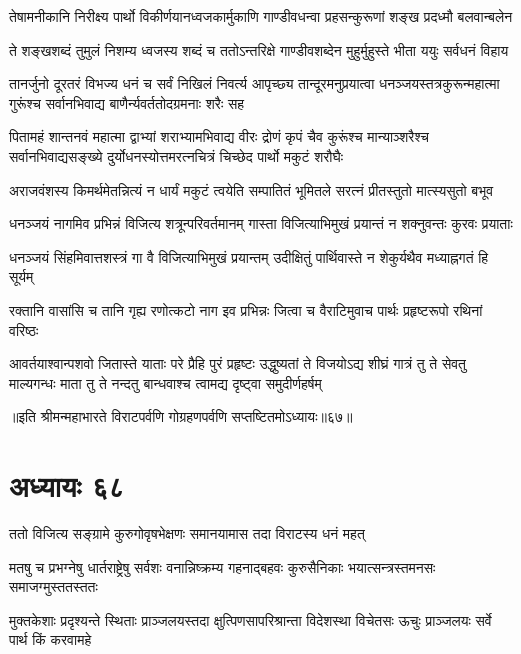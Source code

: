 \twolineshloka
{तेषामनीकानि निरीक्ष्य पार्थो विकीर्णयानध्वजकार्मुकाणि}
{गाण्डीवधन्वा प्रहसन्कुरूणां शङ्ख प्रदध्मौ बलवान्बलेन}


\twolineshloka
{ते शङ्खशब्दं तुमुलं निशम्य ध्वजस्य शब्दं च ततोऽन्तरिक्षे}
{गाण्डीवशब्देन मुहुर्मुहुस्ते भीता ययुः सर्वधनं विहाय}


\threelineshloka
{तानर्जुनो दूरतरं विभज्य धनं च सर्वं निखिलं निवर्त्य}
{आपृच्छ्य तान्दूरमनुप्रयात्वा धनञ्जयस्तत्रकुरून्महात्मा}
{गुरूंश्च सर्वानभिवाद्य बाणैर्न्यवर्ततोदग्रमनाः शरैः सह}


\threelineshloka
{पितामहं शान्तनवं महात्मा द्वाभ्यां शराभ्यामभिवाद्य वीरः}
{द्रोणं कृपं चैव कुरूंश्च मान्याञ्शरैश्च सर्वानभिवाद्यसङ्ख्ये}
{दुर्योधनस्योत्तमरत्नचित्रं चिच्छेद पार्थो मकुटं शरौघैः}


\twolineshloka
{अराजवंशस्य किमर्थमेतन्नित्यं न धार्यं मकुटं त्वयेति}
{सम्पातितं भूमितले सरत्नं प्रीतस्तुतो मात्स्यसुतो बभूव}


\twolineshloka
{धनञ्जयं नागमिव प्रभिन्नं विजित्य शत्रून्परिवर्तमानम्}
{गास्ता विजित्याभिमुखं प्रयान्तं न शक्नुवन्तः कुरवः प्रयाताः}


\twolineshloka
{धनञ्जयं सिंहमिवात्तशस्त्रं गा वै विजित्याभिमुखं प्रयान्तम्}
{उदीक्षितुं पार्थिवास्ते न शेकुर्यथैव मध्याह्नगतं हि सूर्यम्}


\twolineshloka
{रक्तानि वासांसि च तानि गृह्य रणोत्कटो नाग इव प्रभिन्नः}
{जित्वा च वैराटिमुवाच पार्थः प्रहृष्टरूपो रथिनां वरिष्ठः}


\threelineshloka
{आवर्तयाश्वान्पशवो जितास्ते याताः परे प्रैहि पुरं प्रहृष्टः}
{उद्धुष्यतां ते विजयोऽद्य शीघ्रं गात्रं तु ते सेवतु माल्यगन्धः}
{माता तु ते नन्दतु बान्धवाश्च त्वामद्य दृष्ट्वा समुदीर्णहर्षम्}

॥इति श्रीमन्महाभारते विराटपर्वणि गोग्रहणपर्वणि सप्तष्टितमोऽध्यायः॥६७॥

\chapter{अध्यायः ६८}

\twolineshloka
{ततो विजित्य सङ्ग्रामे कुरुगोवृषभेक्षणः}
{समानयामास तदा विराटस्य धनं महत्}


\threelineshloka
{मतषु च प्रभग्नेषु धार्तराष्ट्रेषु सर्वशः}
{वनान्निष्क्रम्य गहनाद्बहवः कुरुसैनिकाः}
{भयात्सन्त्रस्तमनसः समाजग्मुस्ततस्ततः}


\threelineshloka
{मुक्तकेशाः प्रदृश्यन्ते स्थिताः प्राञ्जलयस्तदा}
{क्षुत्पिणसापरिश्रान्ता विदेशस्था विचेतसः}
{ऊचुः प्राञ्जलयः सर्वे पार्थ किं करवामहे}


